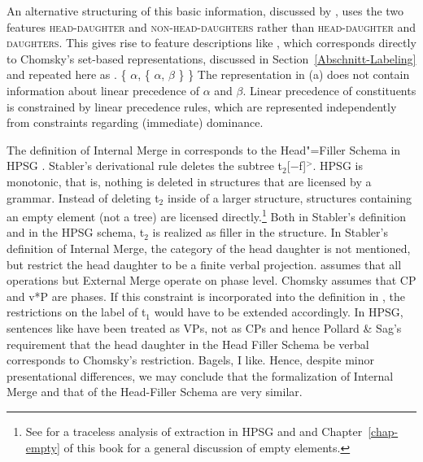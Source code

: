 \noindent
An alternative structuring of this basic information, discussed by \citet[Chapter 9]{ps2},
uses the two features \textsc{head-daughter} and \textsc{non-head-daughters} rather than
\textsc{head-daughter} and \textsc{daughters}. This gives rise to feature descriptions like , which corresponds
directly to Chomsky's set-based representations, discussed in Section~\ref{Abschnitt-Labeling} and
repeated here as .
\eal
\ex {}
\ex \{ $\alpha$, \{ $\alpha$, $\beta$ \} \}
\zl
The representation in (a) does not contain information about linear precedence of $\alpha$ and
$\beta$. Linear precedence of constituents is constrained by linear precedence rules, which are
represented independently from constraints regarding (immediate) dominance.

The definition of Internal Merge in  corresponds to the Head"=Filler Schema in HPSG
\citep[]{ps2}. Stabler's derivational rule deletes the subtree t$_2$[$-$f]$^>$. HPSG is
monotonic, that is, nothing is deleted in structures that are licensed by a grammar. Instead of deleting t$_2$ inside of a larger structure, structures
    containing an empty element (not a tree) are licensed directly.\footnote{%
  See  for a traceless analysis of extraction in HPSG and  and Chapter~\ref{chap-empty} of this book for a general discussion of empty elements.%
} Both in Stabler's definition and in the HPSG schema, t$_2$ is realized as filler in the
structure. In Stabler's definition of Internal Merge, the category of the head daughter is not
mentioned, but \citet[]{ps2} restrict the head daughter to be a finite verbal projection. \citet[]{Chomsky2007a} assumes that all operations but External Merge operate on phase level. Chomsky
assumes that CP and v*P are phases. If this constraint is incorporated into the definition in
, the restrictions on the label of t$_1$ would have to be extended
accordingly. In HPSG, sentences like  have been treated as VPs, not as CPs and hence Pollard \&
Sag's requirement that the head daughter in the Head Filler Schema be verbal corresponds to Chomsky's restriction.
\ea
Bagels, I like.
\z
\addlines[-2]
Hence, despite minor presentational differences, we may conclude that the formalization of Internal
Merge and that of the Head-Filler Schema are very similar.

